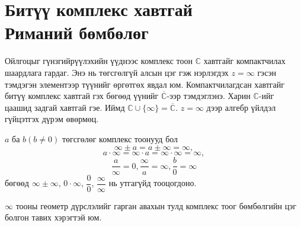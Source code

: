 \section{Битүү комплекс хавтгай  \\ Риманий бөмбөлөг}

Ойлгоцыг гүнзгийрүүлэхийн үүднээс комплекс тоон $\mathbb{C}$ хавтгайг компактчилах шаардлага гардаг. Энэ нь төгсгөлгүй алсын цэг  гэж нэрлэгдэх $z=\infty$ гэсэн тэмдэгэн элементээр түүнийг өргөтгөх явдал юм. Компактчилагдсан хавтгайг битүү комплекс хавтгай гэх бөгөөд үүнийг $\overline{\mathbb{C}}$-ээр тэмдэглэнэ. Харин $\mathbb{C}$-ийг цаашид задгай хавтгай гэе. Иймд $\mathbb{C}\cup \{\infty\}=\overline{\mathbb{C}}.$ $z=\infty$ дээр алгебр үйлдэл гүйцэтгэх дүрэм өвөрмөц.

$a$ ба $b (b\neq 0)$ төгсгөлөг комплекс тоонууд бол 
$$\infty \pm a=a\pm \infty =\infty , $$ 
$$a \cdot \infty =\infty \cdot a = \infty \cdot \infty=\infty, $$ 
$$\dfrac{a}{\infty}=0 , \dfrac{\infty}{a}=\infty , \dfrac{b}{0}=\infty$$ бөгөөд $\infty \pm \infty$, $0\cdot \infty$, $\dfrac{0}{0}$, $\dfrac{\infty}{\infty}$ нь утгагүйд тооцогдоно.

$\infty$ тооны геометр дүрслэлийг гарган авахын тулд комплекс тоог бөмбөлгийн цэг болгон тавих хэрэгтэй юм.

